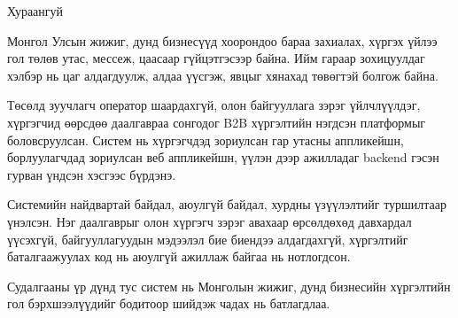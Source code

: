 
\vspace*{-1cm}
\vspace{0.8cm}

\begin{center}
{\headingfont\Large \ttitle\par}
\bigskip
{\headingfont\Large \deptname\par}
\bigskip

{\large \shortname\par}
{\headingfont\Large Хураангуй\par}

{\normalsize \par}
\end{center}
\vspace{1cm}


\bigskip

Монгол Улсын жижиг, дунд бизнесүүд хоорондоо бараа захиалах, хүргэх үйлээ гол төлөв утас, мессеж, цаасаар гүйцэтгэсээр байна. Ийм гараар зохицуулдаг хэлбэр нь цаг алдагдуулж, алдаа үүсгэж, явцыг хянахад төвөгтэй болгож байна.

Төсөлд зуучлагч оператор шаардахгүй, олон байгууллага зэрэг үйлчлүүлдэг, хүргэгчид өөрсдөө даалгавраа сонгодог B2B хүргэлтийн нэгдсэн платформыг боловсруулсан. Систем нь хүргэгчдэд зориулсан гар утасны аппликейшн, борлуулагчдад зориулсан веб аппликейшн, үүлэн дээр ажилладаг backend гэсэн гурван үндсэн хэсгээс бүрдэнэ.

Системийн найдвартай байдал, аюулгүй байдал, хурдны үзүүлэлтийг туршилтаар үнэлсэн. Нэг даалгаврыг олон хүргэгч зэрэг авахаар өрсөлдөхөд давхардал үүсэхгүй, байгууллагуудын мэдээлэл бие биендээ алдагдахгүй, хүргэлтийг баталгаажуулах код нь аюулгүй ажиллаж байгаа нь нотлогдсон.

Судалгааны үр дүнд тус систем нь Монголын жижиг, дунд бизнесийн хүргэлтийн гол бэрхшээлүүдийг бодитоор шийдэж чадах нь батлагдлаа.


\vfill
